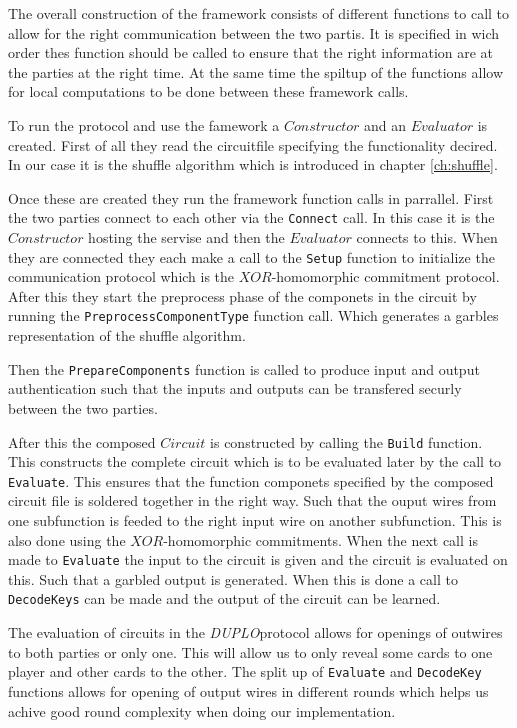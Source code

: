 \documentclass[twoside,11pt,openright]{report}
\newcommand{\DUPLO}{\textit{DUPLO}}
\begin{document}
The overall construction of the framework consists of different functions to call to allow for the right communication between the two partis. It is specified in wich order thes function should be called to ensure that the right information are at the parties at the right time. At the same time the spiltup of the functions allow for local computations to be done between these framework calls.

To run the protocol and use the famework a $Constructor$ and an $Evaluator$ is created. First of all they read the circuitfile specifying the functionality decired. In our case it is the shuffle algorithm which is introduced in chapter \ref{ch:shuffle}.

Once these are created they run the framework function calls in parrallel. First the two parties connect to each other via the \verb|Connect| call. In this case it is the $Constructor$ hosting the servise and then the $Evaluator$ connects to this. When they are connected they each make a call to the \verb|Setup| function to initialize the communication protocol which is the $XOR$-homomorphic commitment protocol. After this they start the preprocess phase of the componets in the circuit by running the \verb|PreprocessComponentType| function call. Which generates a garbles representation of the shuffle algorithm.

Then the \verb|PrepareComponents| function is called to produce input and output authentication such that the inputs and outputs can be transfered securly between the two parties.

After this the composed $Circuit$ is constructed by calling the \verb|Build| function. This constructs the complete circuit which is to be evaluated later by the call to \verb|Evaluate|. This ensures that the function componets specified by the composed circuit file is soldered together in the right way. Such that the ouput wires from one subfunction is feeded to the right input wire on another subfunction. This is also done using the $XOR$-homomorphic commitments. When the next call is made to \verb|Evaluate| the input to the circuit is given and the circuit is evaluated on this. Such that a garbled output is generated. When this is done a call to \verb|DecodeKeys| can be made and the output of the circuit can be learned.

\bigskip

The evaluation of circuits in the \DUPLO protocol allows for openings of outwires to both parties or only one. This will allow us to only reveal some cards to one player and other cards to the other. The split up of \verb|Evaluate| and \verb|DecodeKey| functions allows for opening of output wires in different rounds which helps us achive good round complexity when doing our implementation.
\end{document}
